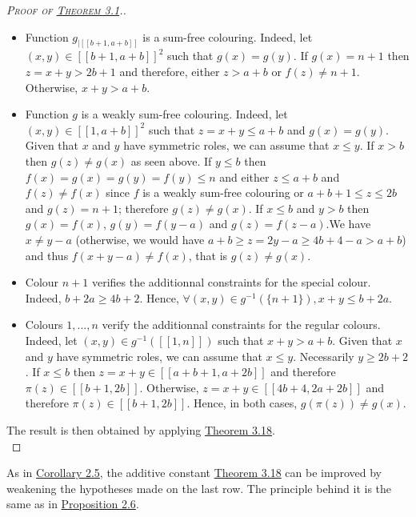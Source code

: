 \begin{proof}[\textsc{Proof of \hyperref[Theorem3.1]{Theorem 3.1}.}]
\begin{itemize}
\item Function \(g_{|[\![b + 1, a + b]\!]}\) is a sum-free colouring. Indeed, let \((x, y) \in 
	[\![b + 1, a + b]\!]^2\) such that \(g(x) = g(y)\). If \(g(x) = n + 1\) then \(z = x + y > 2 b + 1\) 
	and therefore, either \(z > a + b\) or \(f(z) \neq n + 1\). Otherwise, \(x + y > a + b\).
\item Function \(g\) is a weakly sum-free colouring. Indeed, let \((x, y) \in [\![1, a + b]\!]^2\) such that 
	\(z = x + y \leqslant a + b\) and \(g(x) = g(y)\). Given that \(x\) and \(y\) have symmetric roles, 
	we can assume that \(x \leqslant y\). If \(x > b\) then \(g(z) \neq g(x)\) as seen above. If \(y \leqslant b\) then 
	\(f(x) = g(x) = g(y) = f(y) \leqslant n\) and either \(z \leqslant a + b\) and \(f(z) \neq f(x)\) since \(f\) is a weakly 
	sum-free colouring or \(a + b + 1 \leqslant z \leqslant 2 b\) and \(g(z) = n + 1\); therefore \(g(z) \neq g(x)\). If 
	\(x \leqslant b\) and \(y > b\) then \(g(x) = f(x)\), \(g(y) = f(y - a)\) and \(g(z) = f(z - a)\).We have \(x \neq y - a\) 
	(otherwise, we would have \(a + b \geqslant z = 2 y  - a \geqslant 4 b + 4 - a > a + b\)) and thus \(f(x + y - a) \neq f(x)\),
	that is \(g(z) \neq g(x)\).
\item Colour \(n + 1\) verifies the additionnal constraints for the special colour. Indeed, \(b + 2 a \geqslant 4 b + 2\). 
	Hence, \(\forall (x, y) \in g^{-1}(\{n + 1\}), x + y \leqslant b + 2 a\).
\item Colours \(1, ..., n\) verify the additionnal constraints for the regular colours. Indeed, let 
	\((x, y) \in g^{-1}([\![1, n]\!])\) such that \(x + y > a + b\). Given that \(x\) and \(y\) have symmetric roles, 
	we can assume that \(x \leqslant y\). Necessarily \(y \geqslant 2 b + 2\). If \(x \leqslant b\) then 
	\(z = x + y \in [\![a + b + 1, a + 2 b]\!]\) and therefore \(\pi(z) \in [\![b + 1, 2 b]\!]\). Otherwise, 
	\(z = x + y \in [\![4 b + 4, 2 a + 2 b]\!]\) and therefore \(\pi(z) \in [\![b + 1, 2 b]\!]\). Hence, in both cases, 
	\(g(\pi(z)) \neq g(x)\).
\end{itemize}

The result is then obtained by applying \hyperref[Theorem3.18]{Theorem 3.18}. \\
\end{proof}

As in \hyperref[Corollary2.5]{Corollary 2.5}, the additive constant \hyperref[Theorem3.18]{Theorem 3.18} can be improved 
by weakening the hypotheses made on the last row. The principle behind it is the same as in \hyperref[Proposition2.6]{Proposition 2.6}.

